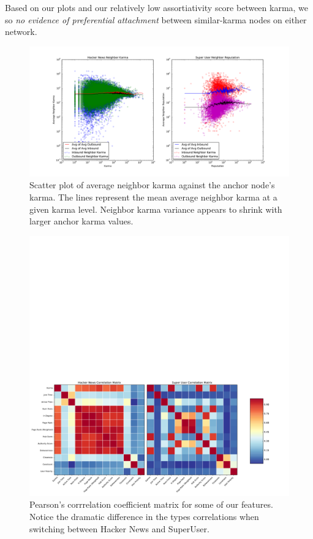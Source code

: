 \documentclass[11pt]{article}
\begin{document}
Based on our plots and our relatively low assortiativity score between karma, we
so \textit{no evidence of preferential attachment} between similar-karma nodes
on either network.


\begin{figure}[t]
\centering
\includegraphics[width=\linewidth]{karma_cliques}
\caption{Scatter plot of average neighbor karma against the anchor node's karma. 
The lines represent the mean average neighbor karma at a given karma level.
Neighbor karma variance appears to shrink with larger anchor karma values.}
\label{fig:karma_cliques}
\end{figure}

\begin{figure}[t]
\centering
\includegraphics[width=0.9\linewidth]{correlation}
\caption{Pearson's corrrelation coefficient matrix for some of our features.
Notice the dramatic difference in the types correlations when switching
between Hacker News and SuperUser.}
\label{fig:correlation}
\end{figure}
\end{document}
